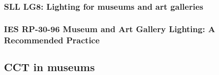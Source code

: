 \subsubsection{SLL LG8: Lighting for museums and art galleries}

\citet{cibse_lighting_2015}



\subsubsection{IES RP-30-96 Museum and Art Gallery Lighting: A Recommended Practice}

\citet{ies_ies_1996}





















\subsection{CCT in museums}
\label{sec:CCTmus}


